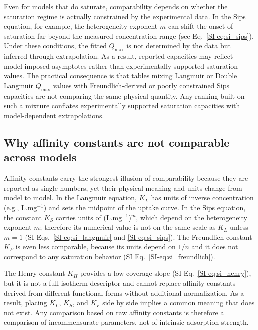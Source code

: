 \documentclass[journal=jacsat,manuscript=article]{achemso}
\begin{document}
Even for models that do saturate, comparability depends on whether the saturation regime is actually constrained by the experimental data. In the Sips equation, for example, the heterogeneity exponent $m$ can shift the onset of saturation far beyond the measured concentration range (see Eq.~\ref{SI-eq:si_sips}). Under these conditions, the fitted $Q_{\max}$ is not determined by the data but inferred through extrapolation. As a result, reported capacities may reflect model-imposed asymptotes rather than experimentally supported saturation values. The practical consequence is that tables mixing Langmuir or Double Langmuir $Q_{\max}$ values with Freundlich-derived or poorly constrained Sips capacities are not comparing the same physical quantity. Any ranking built on such a mixture conflates experimentally supported saturation capacities with model-dependent extrapolations.

\subsection{Why affinity constants are not comparable across models}
\label{sec:kaff_problem}


Affinity constants carry the strongest illusion of comparability because they
are reported as single numbers, yet their physical meaning and units change
from model to model. In the Langmuir equation, $K_L$ has units of inverse
concentration (e.g., L.mg$^{-1}$) and sets the midpoint of the uptake curve.
In the Sips equation, the constant $K_S$ carries units of
(L.mg$^{-1}$)$^{m}$, which depend on the heterogeneity exponent $m$; therefore
its numerical value is not on the same scale as $K_L$ unless $m = 1$
(SI Eqs.~\eqref{SI-eq:si_langmuir} and \eqref{SI-eq:si_sips}). The Freundlich
constant $K_F$ is even less comparable, because its units depend on $1/n$ and it
does not correspond to any saturation behavior (SI
Eq.~\eqref{SI-eq:si_freundlich}).

The Henry constant $K_H$ provides a low-coverage slope (SI
Eq.~\eqref{SI-eq:si_henry}), but it is not a
full-isotherm descriptor and cannot replace affinity constants derived from
different functional forms without additional normalization. As a result,
placing $K_L$, $K_S$, and $K_F$ side by side implies a common meaning that does
not exist. Any comparison based on raw affinity constants is therefore a
comparison of incommensurate parameters, not of intrinsic adsorption strength.
\end{document}
